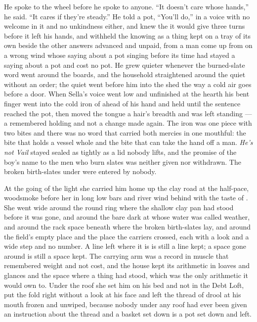 He spoke to the wheel before he spoke to anyone. “It doesn't care whose hands,” he said. “It cares if they're steady.” He told a pot, “You'll do,” in a voice with no welcome in it and no unkindness either, and knew the  it would give three turns before it left his hands, and withheld the knowing as a thing kept on a tray of its own beside the other answers advanced and unpaid, from a man come up from  on a wrong wind whose saying about a pot singing before its time had stayed a saying about a pot and cost no pot. He grew quieter whenever the burned-slate word went around the boards, and the household straightened around the quiet without an order; the quiet went before him into the shed the way a cold air goes before a door. When Sella's voice went low and unfinished at the hearth his bent finger went into the cold iron of  ahead of his hand and held until the sentence reached the pot, then moved the tongue a hair's breadth and was left standing --- a remembered holding and not a change made again. The iron was one piece with two bites and there was no  word that carried both mercies in one mouthful: the bite that holds a vessel whole and the bite that can take the hand off a man. \emph{He's not Vail} stayed sealed as tightly as a lid nobody lifts, and the promise of the boy's name to the men who burn slates was neither given nor withdrawn. The broken birth-slates under  were entered by nobody.

\scenebreak

At the going of the light she carried him home up the clay road at the half-pace, woodsmoke before her in long low bars and river wind behind with the taste of . She went wide around the round ring where the shallow clay pan had stood before it was gone, and around the bare dark  at  whose water was called weather, and around the rack space beneath  where the broken birth-slates lay, and around the field's empty place and the place the carriers crossed, each with a look and a wide step and no number. A line left where it is is still a line kept; a space gone around is still a space kept. The carrying arm was a record in muscle that remembered weight and not cost, and the house kept its arithmetic in loaves and glances and the space where a thing had stood, which was the only arithmetic it would own to. Under the roof she set him on his bed and not in the Debt Loft, put the fold right without a look at his face and left the thread of drool at his mouth frozen and unwiped, because nobody under any roof had ever been given an instruction about the thread and a basket set down is a pot set down and left.

